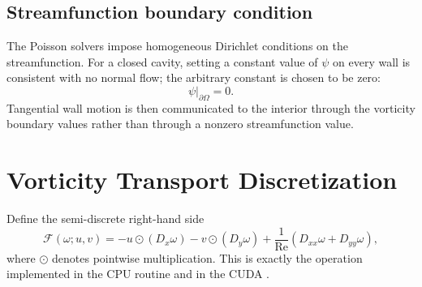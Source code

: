 \documentclass[11pt,a4paper]{article}
\newcommand{\Rey}{\mathrm{Re}}
\newcommand{\code}[1]{\texttt{\detokenize{#1}}}
\begin{document}
\subsection{Streamfunction boundary condition}

The Poisson solvers impose homogeneous Dirichlet conditions on the streamfunction.  For a closed cavity, setting a constant value of $\psi$ on every wall is consistent with no normal flow; the arbitrary constant is chosen to be zero:
\begin{equation}
\psi|_{\partial\Omega}=0.
\end{equation}
Tangential wall motion is then communicated to the interior through the vorticity boundary values rather than through a nonzero streamfunction value.

\section{Vorticity Transport Discretization}

Define the semi-discrete right-hand side
\begin{equation}
\mathcal{F}(\omega;u,v)
=-u\odot(D_x\omega)
-v\odot(D_y\omega)
+\frac{1}{\Rey}\left(D_{xx}\omega+D_{yy}\omega\right),
\label{eq:semi-discrete}
\end{equation}
where $\odot$ denotes pointwise multiplication.  This is exactly the operation implemented in the CPU \code{dwdt()} routine and in the CUDA \code{rhs_kernel}.
\end{document}
